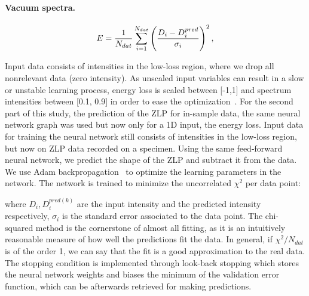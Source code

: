 \paragraph{Vacuum spectra.}
%

\begin{equation}\label{eq:chi2}
\begin{centering}
    E = \frac{1}{N_{dat}}\sum_{i=1}^{N_{dat}}\left(\frac{D_i - D_i^{pred}}{\sigma_i}\right)^2, 
\end{centering}
\end{equation}

%
Input data consists of intensities in the low-loss region, 
where we drop all nonrelevant data (zero intensity). As unscaled input variables
can result in a slow or unstable learning process,
energy loss is scaled between [-1,1] and spectrum intensities between [0.1, 0.9]
in order to ease the optimization~\cite{Ball:2008by}.
%
For the second part of this study, the prediction of the ZLP for in-sample data,
the same neural network graph was used but now only for a 1D input, the energy loss. 
%
Input data for training the neural network still consists of intensities in the low-loss region, 
but now on ZLP data recorded on a specimen. Using the same feed-forward neural network,
we predict the shape of the ZLP and subtract it from the data.
%
We use Adam backpropagation~\cite{Kingma:2017} to optimize the learning parameters in the network. 
The network is trained to minimize the uncorrelated $\chi^2$ per data point:



where $D_i, D_i^{pred(k)}$ are the input intensity and the predicted 
intensity respectively,
$\sigma_i$ is the standard error associated to the data point. 
%
The chi-squared method is the cornerstone of almost all fitting, as it is 
an intuitively reasonable measure of how well the predictions fit the data.
In general, if $\chi^2/N_{dat}$ is of the order 1, we can say that the fit is a 
good approximation to the real data. \\
%
The stopping condition is implemented through look-back stopping which stores 
the neural network weights and biases the minimum of the validation error function,  
which can be afterwards retrieved for 
making predictions.
%



